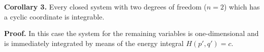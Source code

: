 \textbf{Corollary 3.} Every closed system with two degrees of freedom ($n = 2$) which has a cyclic coordinate is integrable.

\textbf{Proof.} In this case the system for the remaining variables is one-dimensional and is immediately integrated by means of the energy integral $H(p', q') = c$.
